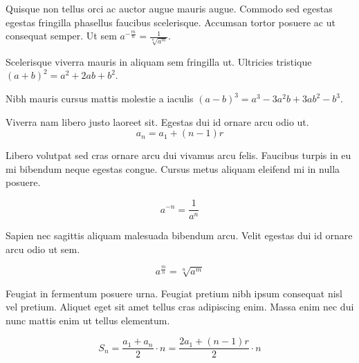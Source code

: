 \documentclass{article}
\begin{document}
Quisque non tellus orci ac auctor augue mauris augue. Commodo sed egestas egestas fringilla phasellus faucibus scelerisque. Accumsan tortor posuere ac ut consequat semper. Ut sem \begin{math}
	a^{-\frac{m}{n}}=\frac{1}{\sqrt[n]{a^{m}}}
\end{math}.\newline

Scelerisque viverra mauris in aliquam sem fringilla ut. Ultricies tristique $ (a+b)^{2}=a^{2}+2ab+b^{2} $.\newline

Nibh mauris cursus mattis molestie a iaculis \( (a-b)^{3}=a^{3}-3a^{2}b+3ab^{2}-b^{3} \).\newline

Viverra nam libero justo laoreet sit. Egestas dui id ornare arcu odio ut.
\[ a_{n}=a_{1}+(n-1)r \]

Libero volutpat sed cras ornare arcu dui vivamus arcu felis. Faucibus turpis in eu mi bibendum neque egestas congue. Cursus metus aliquam eleifend mi in nulla posuere.

$$ a^{-n}=\frac{1}{a^{n}} $$

Sapien nec sagittis aliquam malesuada bibendum arcu. Velit egestas dui id ornare arcu odio ut sem. 

\begin{displaymath}
	a^{\frac{m}{n}}=\sqrt[n]{a^{m}}
\end{displaymath}

Feugiat in fermentum posuere urna. Feugiat pretium nibh ipsum consequat nisl vel pretium. Aliquet eget sit amet tellus cras adipiscing enim. Massa enim nec dui nunc mattis enim ut tellus elementum.

\begin{equation}
	S_{n}=\frac{a_{1}+a_{n}}{2}\cdot n=\frac{2a_{1}+(n-1)r}{2}\cdot n
\end{equation}
\end{document}
